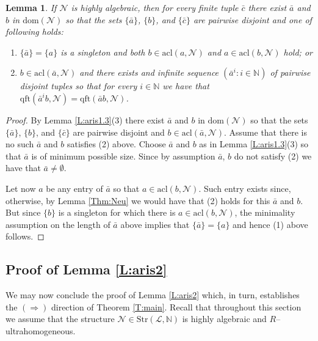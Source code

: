 \documentclass[11pt]{amsart}
\theoremstyle{plain}
\newtheorem{lemma}[theorem]{Lemma}
\theoremstyle{definition}
\begin{document}
\begin{lemma}\label{L:aris1.5}
If $\mathcal{N}$ is highly algebraic, then for every finite tuple $\bar{c}$ there exist  $\bar{a}$ and  $b$ in $\mathrm{dom}(\mathcal{N})$ so that the sets $\{\bar{a}\}$, $\{b\}$, and $\{\bar{c}\}$ are pairwise disjoint and one of following holds:
\begin{enumerate}
\item $\{\bar{a}\}=\{a\}$ is a singleton and both $b\in \mathrm{acl}(a,\mathcal{N})$ and $a\in \mathrm{acl}(b,\mathcal{N})$ hold; or
\item $b\in \mathrm{acl}(\bar{a},\mathcal{N})$ and there exists and infinite sequence $(\bar{a}^i\colon i\in \mathbb{N})$ of  pairwise disjoint tuples so that  for every $i\in\mathbb{N}$ we have that $\mathrm{qft}(\bar{a}^ib,\mathcal{N})=\mathrm{qft}(\bar{a}b,\mathcal{N})$.
\end{enumerate}
\end{lemma}
\begin{proof}

By Lemma \ref{L:aris1.3}(3) there exist
 $\bar{a}$ and  $b$ in $\mathrm{dom}(\mathcal{N})$ so that the sets $\{\bar{a}\}$, $\{b\}$, and $\{\bar{c}\}$ are pairwise disjoint and  $b\in \mathrm{acl}(\bar{a},\mathcal{N})$. Assume that there is no such  $\bar{a}$ and  $b$ satisfies (2) above.   Choose   $\bar{a}$ and $b$ as in Lemma \ref{L:aris1.3}(3) so that  $\bar{a}$ is of minimum possible size. Since by assumption  $\bar{a}$,  $b$ do not satisfy (2) we have that $\bar{a}\neq \emptyset$.
 
 Let now $a$ be any entry of $\bar{a}$ so that $a\in \mathrm{acl}(b,\mathcal{N})$. Such  entry exists since, otherwise, by Lemma \ref{Thm:Neu} we would have that (2) holds for this $\bar{a}$ and  $b$.  But since $\{b\}$ is a singleton for which there is $a\in \mathrm{acl}(b,\mathcal{N})$, the minimality assumption on the length of $\bar{a}$ above implies that  $\{\bar{a}\}=\{a\}$ and hence  (1) above follows. 
\end{proof}


















\subsection{Proof  of Lemma \ref{L:aris2}} \label{SS:2} We may now conclude the proof  of Lemma \ref{L:aris2} which, in turn, establishes  the $(\Rightarrow)$ direction of Theorem \ref{T:main}. Recall that throughout this section we assume that the structure $\mathcal{N}\in\mathrm{Str}(\mathcal{L},\mathbb{N})$  is  highly algebraic and  $R$--ultrahomogeneous. 
\end{document}
